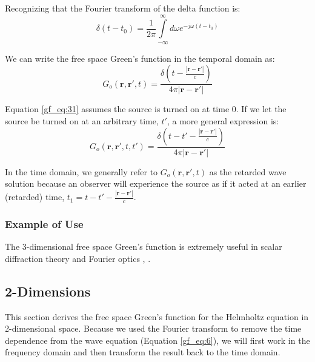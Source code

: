 Recognizing that the Fourier transform of the delta function is:
\begin{equation}
\delta(t-t_0) = \frac{1}{2\pi}\int\limits_{-\infty}^{\infty}d\omega e^{-j\omega \left(t-t_0\right)}
\label{gf_eq:30}
\end{equation}
\renewcommand{\baselinestretch}{2} \small\normalsize

We can write the free space Green's function in the temporal domain as:
\begin{equation}
\boxed{G_o\left(\mathbf{r},\mathbf{r}',t\right) = \frac{\delta\left(t-\frac{|\mathbf{r}-\mathbf{r}'|}{c} \right)}{4\pi |\mathbf{r}-\mathbf{r}'|}}
\label{gf_eq:31}
\end{equation}
\renewcommand{\baselinestretch}{2} \small\normalsize

Equation \ref{gf_eq:31} assumes the source is turned on at time $0$. If we let the source be turned on at an arbitrary time, $t'$, a more general expression is:
\begin{equation}
G_o\left(\mathbf{r},\mathbf{r}',t,t'\right) = \frac{\delta\left(t-t'-\frac{|\mathbf{r}-\mathbf{r}'|}{c} \right)}{4\pi |\mathbf{r}-\mathbf{r}'|}
\label{gf_eq:32}
\end{equation}
\renewcommand{\baselinestretch}{2} \small\normalsize

In the time domain, we generally refer to $G_o\left(\mathbf{r},\mathbf{r}',t\right)$ as the retarded wave solution because an observer will experience the source as if it acted at an earlier (retarded) time, $t_1=t-t'-\frac{|\mathbf{r}-\mathbf{r}'|}{c}$.

\subsubsection{Example of Use}
The 3-dimensional free space Green's function is extremely useful in scalar diffraction theory and Fourier optics \cite{goodman_fourier}, \cite{born_wolf_po}.

\subsection{2-Dimensions}\label{gf_sec:2d}
This section derives the free space Green's function for the Helmholtz equation in 2-dimensional space. Because we used the Fourier transform to remove the time dependence from the wave equation (Equation \ref{gf_eq:6}), we will first work in the frequency domain and then transform the result back to the time domain.

